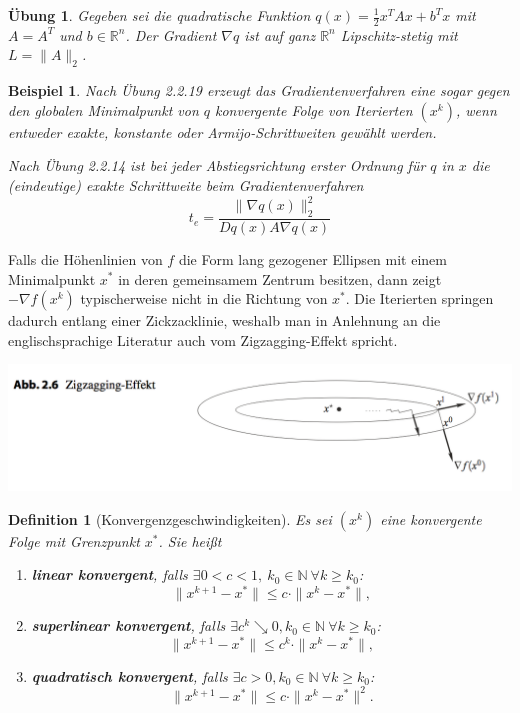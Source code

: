 \documentclass[11pt]{scrreprt}
\newcounter{thm}
\theoremstyle{thmstyle}
\numberwithin{thm}{section}
\newtheorem{beispiel}[thm]{Beispiel}
\newtheorem{definition}[thm]{Definition}
\newtheorem{uebung}[thm]{Übung}
\begin{document}
\begin{uebung}
	Gegeben sei die quadratische Funktion $q(x) = \frac{1}{2} x^T A x + b^T x$ mit $A = A^T$ und $b \in \mathbb{R}^n$. Der Gradient $\nabla q$ ist auf ganz $\mathbb{R}^n$ Lipschitz-stetig mit $L = \| A \|_2$. 
\end{uebung}

\begin{beispiel}
	Nach Übung 2.2.19 erzeugt das Gradientenverfahren eine sogar gegen den globalen Minimalpunkt von $q$ konvergente Folge von Iterierten $(x^k)$, wenn entweder exakte, konstante oder Armijo-Schrittweiten gewählt werden. ~\bigskip
	
	Nach Übung 2.2.14 ist bei jeder Abstiegsrichtung erster Ordnung für $q$ in $x$ die (eindeutige) exakte Schrittweite beim Gradientenverfahren 
	$$ t_e = \frac{\| \nabla q(x) \|_2^2}{D q(x) A \nabla q(x)} $$
\end{beispiel}

Falls die Höhenlinien von $f$ die Form lang gezogener Ellipsen mit einem Minimalpunkt $x^*$ in deren gemeinsamem Zentrum besitzen, dann zeigt $-\nabla f(x^k)$ typischerweise nicht in die Richtung von $x^*$. Die Iterierten springen dadurch entlang einer Zickzacklinie, weshalb man in Anlehnung an die englischsprachige Literatur auch vom Zigzagging-Effekt spricht.

\begin{center}
	\includegraphics[scale=0.5]{ab26}
\end{center}

\begin{definition}[Konvergenzgeschwindigkeiten]
	Es sei $(x^k)$ eine konvergente Folge mit Grenzpunkt $x^*$. Sie heißt
	\begin{enumerate}[label=\alph*\upshape)]
		\item \textbf{linear konvergent}, falls $\exists 0 < c < 1, ~ k_0 \in \mathbb{N} ~\forall k \geq k_0$: $$ \| x^{k+1} - x^*\| \leq c \cdot \| x^k - x^* \|, $$
		\item \textbf{superlinear konvergent}, falls $\exists c^k \searrow 0, k_0 \in \mathbb{N} ~\forall k \geq k_0$: $$ \| x^{k+1} - x^*\| \leq c^k \cdot \| x^k- x^* \|, $$
		\item \textbf{quadratisch konvergent}, falls $\exists c > 0, k_0 \in \mathbb{N} ~\forall k \geq k_0$: $$ \| x^{k+1} - x^* \| \leq c \cdot \| x^k - x^* \|^2. $$
	\end{enumerate}
\end{definition}
\end{document}
